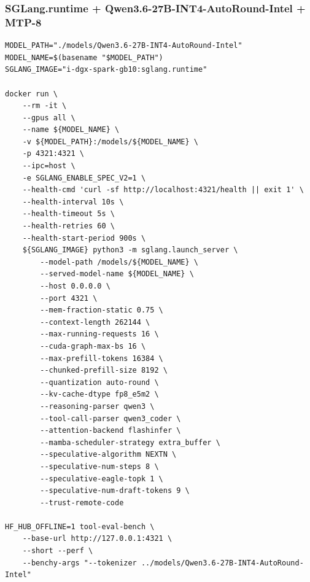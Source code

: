 \documentclass{article}
\begin{document}
\subsubsection{SGLang.runtime + Qwen3.6-27B-INT4-AutoRound-Intel + MTP-8}
\begin{lstlisting}
MODEL_PATH="./models/Qwen3.6-27B-INT4-AutoRound-Intel"
MODEL_NAME=$(basename "$MODEL_PATH")
SGLANG_IMAGE="i-dgx-spark-gb10:sglang.runtime"

docker run \
    --rm -it \
    --gpus all \
    --name ${MODEL_NAME} \
    -v ${MODEL_PATH}:/models/${MODEL_NAME} \
    -p 4321:4321 \
    --ipc=host \
    -e SGLANG_ENABLE_SPEC_V2=1 \
    --health-cmd 'curl -sf http://localhost:4321/health || exit 1' \
    --health-interval 10s \
    --health-timeout 5s \
    --health-retries 60 \
    --health-start-period 900s \
    ${SGLANG_IMAGE} python3 -m sglang.launch_server \
        --model-path /models/${MODEL_NAME} \
        --served-model-name ${MODEL_NAME} \
        --host 0.0.0.0 \
        --port 4321 \
        --mem-fraction-static 0.75 \
        --context-length 262144 \
        --max-running-requests 16 \
        --cuda-graph-max-bs 16 \
        --max-prefill-tokens 16384 \
        --chunked-prefill-size 8192 \
        --quantization auto-round \
        --kv-cache-dtype fp8_e5m2 \
        --reasoning-parser qwen3 \
        --tool-call-parser qwen3_coder \
        --attention-backend flashinfer \
        --mamba-scheduler-strategy extra_buffer \
        --speculative-algorithm NEXTN \
        --speculative-num-steps 8 \
        --speculative-eagle-topk 1 \
        --speculative-num-draft-tokens 9 \
        --trust-remote-code

HF_HUB_OFFLINE=1 tool-eval-bench \
    --base-url http://127.0.0.1:4321 \
    --short --perf \
    --benchy-args "--tokenizer ../models/Qwen3.6-27B-INT4-AutoRound-Intel"
\end{lstlisting}
\end{document}

